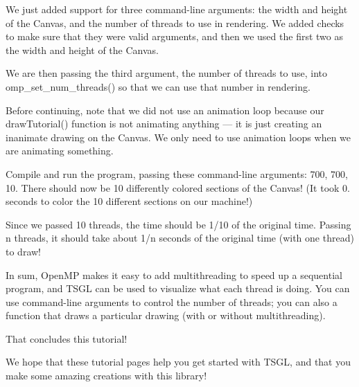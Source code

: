 We just added support for three command-\/line arguments\-: the width and height of the Canvas, and the number of threads to use in rendering. We added checks to make sure that they were valid arguments, and then we used the first two as the width and height of the Canvas.

We are then passing the third argument, the number of threads to use, into {\ttfamily omp\-\_\-set\-\_\-num\-\_\-threads()} so that we can use that number in rendering.

Before continuing, note that we did not use an animation loop because our {\ttfamily draw\-Tutorial()} function is not animating anything — it is just creating an inanimate drawing on the Canvas. We only need to use animation loops when we are animating something.

Compile and run the program, passing these command-\/line arguments\-: 700, 700, 10. There should now be 10 differently colored sections of the Canvas! (It took 0. seconds to color the 10 different sections on our machine!)

Since we passed 10 threads, the time should be 1/10 of the original time. Passing n threads, it should take about 1/n seconds of the original time (with one thread) to draw!

In sum, Open\-M\-P makes it easy to add multithreading to speed up a sequential program, and T\-S\-G\-L can be used to visualize what each thread is doing. You can use command-\/line arguments to control the number of threads; you can also a function that draws a particular drawing (with or without multithreading).

That concludes this tutorial!

We hope that these tutorial pages help you get started with T\-S\-G\-L, and that you make some amazing creations with this library! 
